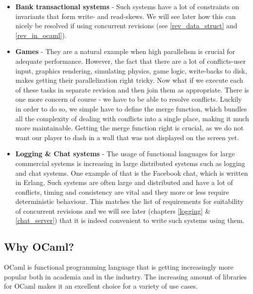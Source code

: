 \documentclass[12pt,twoside,notitlepage]{report}
\begin{document}
\begin{itemize}


\item
{\bfseries Bank transactional systems} - Such systems have a lot of constraints on invariants that form write- and read-skews. We will see later how this can nicely be resolved if using concurrent revisions (see \ref{rev_data_struct} and \ref{rev_in_ocaml}). 

\item
{\bfseries Games} - They are a natural example when high parallelism is crucial for adequate performance. However, the fact that there are a lot of conflicts-user input, graphics rendering, simulating physics, game logic, write-backs to disk, makes getting their parallelization right tricky. Now what if we execute each of these tasks in separate revision and then join them as appropriate. There is one more concern of course - we have to be able to resolve conflicts. Luckily in order to do so, we simple have to define the merge function, which bundles all the complexity of dealing with conflicts into a single place, making it much more maintainable. Getting the merge function right is crucial, as we do not want our player to dash in a wall that was not displayed on the screen yet.

\item
{\bfseries Logging \& Chat systems} - The usage of functional languages for large commercial systems is increasing in large distributed systems such as logging and chat systems. One example of that is the Facebook chat, which is written in Erlang. Such systems are often large and distributed and have a lot of conflicts, timing and consistency are vital and they more or less require deterministic behaviour. This matches the list of requirements for suitability of concurrent revisions and we will see later (chapters \ref{logging} \& \ref{chat_server}) that it is indeed convenient to write such systems using them. 

\end{itemize}

\subsection{Why OCaml?}

OCaml is functional programming language that is getting increasingly more popular both in academia and in the industry. The increasing amount of libraries for OCaml makes it an excellent choice for a variety of use cases. 
\end{document}
